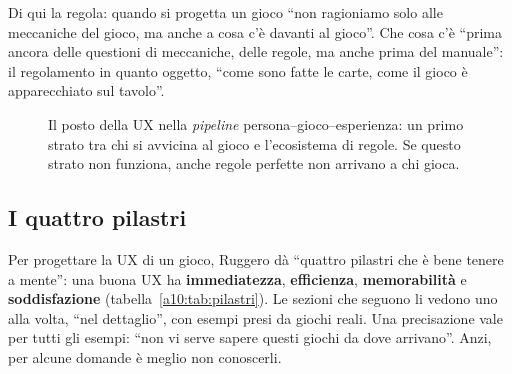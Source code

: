 Di qui la regola: quando si progetta un gioco ``non ragioniamo solo alle meccaniche
del gioco, ma anche a cosa c'è davanti al gioco''. Che cosa c'è ``prima ancora delle
questioni di meccaniche, delle regole, ma anche prima del manuale'': il regolamento in
quanto oggetto, ``come sono fatte le carte, come il gioco è apparecchiato sul
tavolo''.

\begin{figure}[htbp]
\centering
{}
\caption{Il posto della UX nella \emph{pipeline} persona--gioco--esperienza: un primo
strato tra chi si avvicina al gioco e l'ecosistema di regole. Se questo strato non
funziona, anche regole perfette non arrivano a chi gioca.}
\label{a10:fig:pipeline}
\end{figure}

\subsection{I quattro pilastri}
\label{a10:sec:pilastri}

Per progettare la UX di un gioco, Ruggero dà ``quattro pilastri che è bene tenere a
mente'': una buona UX ha \textbf{immediatezza}, \textbf{efficienza},
\textbf{memorabilità} e \textbf{soddisfazione} (tabella~\ref{a10:tab:pilastri}). Le
sezioni che seguono li vedono uno alla volta, ``nel dettaglio'', con esempi presi da
giochi reali. Una precisazione vale per tutti gli esempi: ``non vi serve sapere questi
giochi da dove arrivano''. Anzi, per alcune domande è meglio non conoscerli.

